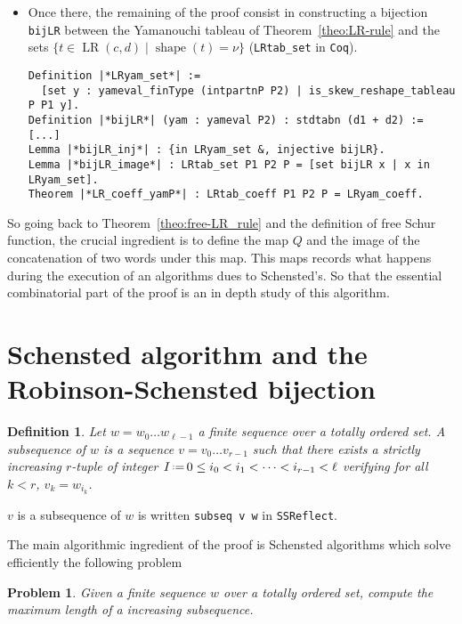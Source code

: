 \documentclass[12pt]{article}
\let\verb=\lstinline
\newcommand{\Coq}{\texttt{Coq}\xspace}
\newcommand{\SSR}{\texttt{SSReflect}\xspace}
\newcommand{\shape}{\operatorname{shape}}
\newcommand{\eqdef}{\mbox{\,\raisebox{0.2ex}{\scriptsize\ensuremath{\mathrm:}}\ensuremath{=}\,}} %
\newtheorem{PROBLEM}{Problem}
\newtheorem{DEFN}{Definition}
\begin{document}
\begin{itemize}
\begin{lstlisting}
Theorem |*LRtab_coeffP*| :
  Schur P1 * Schur P2 = \sum_P (Schur P) *+ LRtab_coeff P.
\end{lstlisting}
\item Once there, the remaining of the proof consist in constructing
  a bijection \verb{bijLR} between the Yamanouchi tableau of
  Theorem~\ref{theo:LR-rule} and the sets $\{t\in\operatorname{LR}(c, d) \mid
  \shape(t) = \nu\}$ (\verb{LRtab_set} in \Coq).
\begin{lstlisting}
Definition |*LRyam_set*| :=
  [set y : yameval_finType (intpartnP P2) | is_skew_reshape_tableau P P1 y].
Definition |*bijLR*| (yam : yameval P2) : stdtabn (d1 + d2) := [...]
Lemma |*bijLR_inj*| : {in LRyam_set &, injective bijLR}.
Lemma |*bijLR_image*| : LRtab_set P1 P2 P = [set bijLR x | x in LRyam_set].
Theorem |*LR_coeff_yamP*| : LRtab_coeff P1 P2 P = LRyam_coeff.
\end{lstlisting}
\end{itemize}
\bigskip

So going back to Theorem~\ref{theo:free-LR_rule} and the definition of free
Schur function, the crucial ingredient is to define the map $Q$ and the image
of the concatenation of two words under this map. This maps records what
happens during the execution of an algorithms dues to Schensted's. So that the
essential combinatorial part of the proof is an in depth study of this
algorithm.

\section{Schensted algorithm and the Robinson-Schensted bijection}

\begin{DEFN}
  Let $w = w_0\dots w_{\ell-1}$ a finite sequence over a totally ordered set. A
  \emph{subsequence} of $w$ is a sequence $v=v_0\dots v_{r-1}$ such that there
  exists a strictly increasing $r$-tuple of integer
  $I\eqdef0\leq i_0<i_1<\dots<i_{r-1}<\ell$ verifying for all $k<r$,
  $v_k = w_{i_k}$.
\end{DEFN}
$v$ is a subsequence of $w$ is written \verb+subseq v w+ in \SSR.

The main algorithmic ingredient of the proof is Schensted algorithms which
solve efficiently the following problem
\begin{PROBLEM}
  Given a finite sequence $w$ over a totally ordered set, compute the maximum
  length of a increasing subsequence.
\end{PROBLEM}
\end{document}

